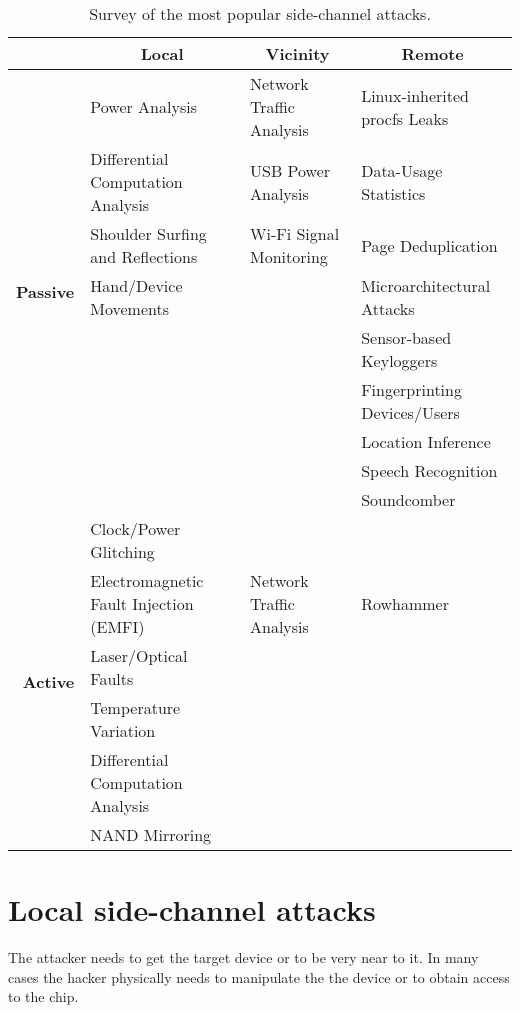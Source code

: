\begin{table}[h]
\centering \footnotesize
\renewcommand*\arraystretch{1.3}
\begin{tabular}{rlll}
\toprule
{} & \multicolumn{1}{c}{\textbf{Local}} & \multicolumn{1}{c}{\textbf{Vicinity}} & \multicolumn{1}{c}{\textbf{Remote}}\\
\midrule
\multirow{9}{*}{\textbf{Passive}} & {Power Analysis} & {Network Traffic Analysis} & {Linux-inherited procfs Leaks}\\
& {Differential Computation Analysis} &  {USB Power Analysis} & {Data-Usage Statistics}\\
& {Shoulder Surfing and Reflections} & {Wi-Fi Signal Monitoring} & {Page Deduplication}\\
& {Hand/Device Movements} &  & {Microarchitectural Attacks}\\
&  &  & {Sensor-based Keyloggers}\\
&  &  & {Fingerprinting Devices/Users}\\
&  &  & {Location Inference}\\
&  &  & {Speech Recognition}\\
&  &  & {Soundcomber}\\
\midrule
\multirow{6}{*}{\textbf{Active}} & {Clock/Power Glitching} &\\
& {Electromagnetic Fault Injection (EMFI)} & {Network Traffic Analysis} & {Rowhammer}\\
& {Laser/Optical Faults} &  & \\
& {Temperature Variation} &  & \\
& {Differential Computation Analysis} &  & \\
& {NAND Mirroring} &  & \\
\bottomrule
\end{tabular}
\caption{\footnotesize{Survey of the most popular side-channel attacks\cite{side_classification}.}}
\label{sc:review}
\end{table}

\section{Local side-channel attacks}
The attacker needs to get the target device or to be very near to it. In many cases the hacker physically needs to manipulate the the device or to obtain access to the chip.
